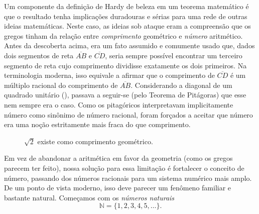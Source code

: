 Um componente da definição de Hardy de beleza em um teorema matemático é que o resultado tenha implicações duradouras e sérias para uma rede de outras ideias matemáticas. Neste caso, as ideias sob ataque eram a compreensão que os gregos tinham da relação entre \textit{comprimento} geométrico e \textit{número} aritmético. Antes da descoberta acima, era um fato assumido e comumente usado que, dados dois segmentos de reta $\overline{AB}$ e $\overline{CD}$, seria sempre possível encontrar um terceiro segmento de reta cujo comprimento dividisse exatamente os dois primeiros. Na terminologia moderna, isso equivale a afirmar que o comprimento de $\overline{CD}$ é um múltiplo racional do comprimento de $\overline{AB}$. Considerando a diagonal de um quadrado unitário (), passava a seguir-se (pelo Teorema de Pitágoras) que esse nem sempre era o caso. Como os pitagóricos interpretavam implicitamente número como sinônimo de número racional, foram forçados a aceitar que número era uma noção estritamente mais fraca do que comprimento.

\begin{figure}[htbp]
  \centering
  \caption{$\sqrt{2}$ existe como comprimento geométrico.}
  \label{fig:sqrt2-geometria}
\end{figure}

Em vez de abandonar a aritmética em favor da geometria (como os gregos parecem ter feito), nossa solução para essa limitação é fortalecer o conceito de número, passando dos números racionais para um sistema numérico mais amplo. De um ponto de vista moderno, isso deve parecer um fenômeno familiar e bastante natural. Começamos com os \textit{números naturais} 
\[
\mathbb{N} = \{1, 2, 3, 4, 5, \dots\}.
\]

